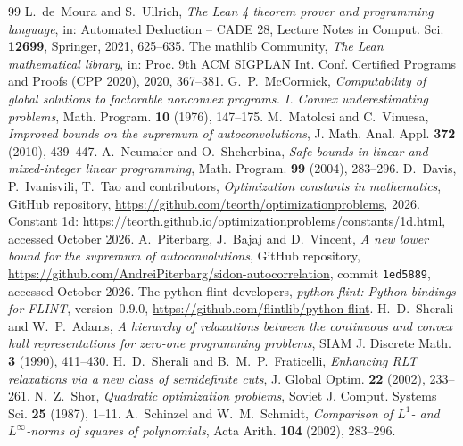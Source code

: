 \documentclass[11pt]{amsart}
\theoremstyle{definition}
\theoremstyle{remark}
\numberwithin{equation}{section}
\begin{document}
\begin{thebibliography}{99}
 L.~de~Moura and S.~Ullrich, \emph{The Lean 4 theorem prover and programming language}, in: Automated Deduction -- CADE 28, Lecture Notes in Comput. Sci. \textbf{12699}, Springer, 2021, 625--635.
 The mathlib Community, \emph{The Lean mathematical library}, in: Proc. 9th ACM SIGPLAN Int. Conf. Certified Programs and Proofs (CPP 2020), 2020, 367--381.
 G.~P.~McCormick, \emph{Computability of global solutions to factorable nonconvex programs. I. Convex underestimating problems}, Math. Program. \textbf{10} (1976), 147--175.
 M.~Matolcsi and C.~Vinuesa, \emph{Improved bounds on the supremum of autoconvolutions}, J. Math. Anal. Appl. \textbf{372} (2010), 439--447.
 A.~Neumaier and O.~Shcherbina, \emph{Safe bounds in linear and mixed-integer linear programming}, Math. Program. \textbf{99} (2004), 283--296.
 D.~Davis, P.~Ivanisvili, T.~Tao and contributors, \emph{Optimization constants in mathematics}, GitHub repository, \url{https://github.com/teorth/optimizationproblems}, 2026. Constant 1d: \url{https://teorth.github.io/optimizationproblems/constants/1d.html}, accessed October 2026.
 A.~Piterbarg, J.~Bajaj and D.~Vincent, \emph{A new lower bound for the supremum of autoconvolutions}, GitHub repository, \url{https://github.com/AndreiPiterbarg/sidon-autocorrelation}, commit \texttt{1ed5889}, accessed October 2026.
 The python-flint developers, \emph{python-flint: Python bindings for FLINT}, version~0.9.0, \url{https://github.com/flintlib/python-flint}.
 H.~D.~Sherali and W.~P.~Adams, \emph{A hierarchy of relaxations between the continuous and convex hull representations for zero-one programming problems}, SIAM J. Discrete Math. \textbf{3} (1990), 411--430.
 H.~D.~Sherali and B.~M.~P.~Fraticelli, \emph{Enhancing RLT relaxations via a new class of semidefinite cuts}, J. Global Optim. \textbf{22} (2002), 233--261.
 N.~Z.~Shor, \emph{Quadratic optimization problems}, Soviet J. Comput. Systems Sci. \textbf{25} (1987), 1--11.
 A.~Schinzel and W.~M.~Schmidt, \emph{Comparison of $L^1$- and $L^\infty$-norms of squares of polynomials}, Acta Arith. \textbf{104} (2002), 283--296.
\end{thebibliography}
\end{document}
